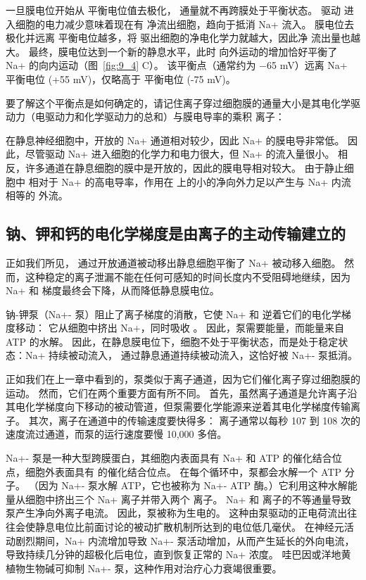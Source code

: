 一旦膜电位开始从  平衡电位值去极化， 通量就不再跨膜处于平衡状态。
驱动  进入细胞的电力减少意味着现在有  净流出细胞，趋向于抵消 Na+ 流入。
膜电位去极化并远离  平衡电位越多，将  驱出细胞的净电化学力就越大，因此净  流出量也越大。
最终，膜电位达到一个新的静息水平，此时  向外运动的增加恰好平衡了 Na+ 的向内运动（图~\ref{fig:9_4} C）。
该平衡点（通常约为 −65 mV）远离 Na+ 平衡电位 (+55 mV)，仅略高于  平衡电位 (-75 mV)。


要了解这个平衡点是如何确定的，请记住离子穿过细胞膜的通量大小是其电化学驱动力（电驱动力和化学驱动力的总和）与膜电导率的乘积 离子：


在静息神经细胞中，开放的 Na+ 通道相对较少，因此 Na+ 的膜电导非常低。
因此，尽管驱动 Na+ 进入细胞的化学力和电力很大，但 Na+ 的流入量很小。
相反，许多通道在静息细胞的膜中是开放的，因此的膜电导相对较大。
由于静止细胞中  相对于 Na+ 的高电导率，作用在  上的小的净向外力足以产生与 Na+ 内流相等的  外流。



\subsection{钠、钾和钙的电化学梯度是由离子的主动传输建立的}

正如我们所见， 通过开放通道被动移出静息细胞平衡了 Na+ 被动移入细胞。
然而，这种稳定的离子泄漏不能在任何可感知的时间长度内不受阻碍地继续，因为 Na+ 和  梯度最终会下降，从而降低静息膜电位。


钠-钾泵（Na+- 泵）阻止了离子梯度的消散，它使 Na+ 和  逆着它们的电化学梯度移动：
它从细胞中挤出 Na+，同时吸收 。
因此，泵需要能量，而能量来自 ATP 的水解。
因此，在静息膜电位下，细胞不处于平衡状态，而是处于稳定状态：Na+ 持续被动流入， 通过静息通道持续被动流入，这恰好被 Na+- 泵抵消。


正如我们在上一章中看到的，泵类似于离子通道，因为它们催化离子穿过细胞膜的运动。
然而，它们在两个重要方面有所不同。
首先，虽然离子通道是允许离子沿其电化学梯度向下移动的被动管道，但泵需要化学能源来逆着其电化学梯度传输离子。
其次，离子在通道中的传输速度要快得多：
离子通常以每秒 107 到 108 次的速度流过通道，而泵的运行速度要慢 10,000 多倍。


Na+- 泵是一种大型跨膜蛋白，其细胞内表面具有 Na+ 和 ATP 的催化结合位点，细胞外表面具有  的催化结合位点。
在每个循环中，泵都会水解一个 ATP 分子。
（因为 Na+- 泵水解 ATP，它也被称为 Na+- ATP 酶。）它利用这种水解能量从细胞中挤出三个 Na+ 离子并带入两个  离子。
Na+ 和  离子的不等通量导致泵产生净向外离子电流。
因此，泵被称为生电的。
这种由泵驱动的正电荷流出往往会使静息电位比前面讨论的被动扩散机制所达到的电位低几毫伏。
在神经元活动剧烈期间，Na+ 内流增加导致 Na+- 泵活动增加，从而产生延长的外向电流，导致持续几分钟的超极化后电位，直到恢复正常的 Na+ 浓度。
哇巴因或洋地黄植物生物碱可抑制 Na+- 泵，这种作用对治疗心力衰竭很重要。


